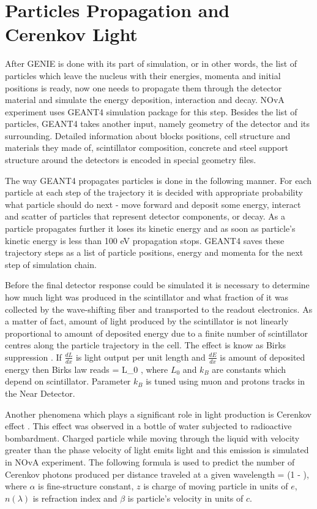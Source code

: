 \section{Particles Propagation and Cerenkov Light}
After GENIE is done with its part of simulation, or in other words, the list of particles which leave 
the nucleus with their energies, momenta and initial positions is ready, now one needs to propagate them
through the detector material and simulate the energy deposition, interaction and decay. NOvA experiment
uses GEANT4 \cite{GEANT4} simulation package for this step. Besides the list of particles, GEANT4 takes
another input, namely geometry of the detector and its surrounding. Detailed information about blocks 
positions, cell structure and materials they made of, scintillator composition, concrete and steel support
structure around the detectors is encoded in special geometry files.

The way GEANT4 propagates particles is done in the following manner. For each particle at each step of the 
trajectory it is decided with appropriate probability what particle should do next - move forward and deposit 
some energy, interact and scatter of particles that represent detector components, or decay. As a particle
propagates further it loses its kinetic energy and as soon as particle's kinetic energy is less than 100 eV
propagation stops. GEANT4 saves these trajectory steps as a list of particle positions, energy and momenta 
for the next step of simulation chain. 

Before the final detector response could be simulated it is necessary to determine how much light was produced
in the scintillator and what fraction of it was collected by the wave-shifting fiber and transported to the 
readout electronics. As a matter of fact, amount of light produced by the scintillator is not linearly 
proportional to amount of deposited energy due to a finite number of scintillator centres along the particle
trajectory in the cell. The effect is know as Birks suppression \cite{birks}. If $\frac{dL}{dx}$ is light 
output per unit length and $\frac{dE}{dx}$ is amount of deposited energy then Birks law reads
\be
{} = L_0 , 
\ee
where $L_0$ and $k_B$ are constants which depend on scintillator. Parameter $k_B$ is tuned using muon and 
protons tracks in the Near Detector.

Another phenomena which plays a significant role in light production is Cerenkov effect \cite{cerenkov}. 
This effect was observed in a bottle of water subjected to radioactive bombardment. Charged particle while
moving through the liquid with velocity greater than the phase velocity of light emits light and this emission 
is simulated in NOvA experiment. The following formula is used to predict the number of Cerenkov photons produced
per distance traveled at a given wavelength 
\be
{} = \Big(1 - \Big),
\ee
where $\alpha$ is fine-structure constant, $z$ is charge of moving particle in units of $e$, $n(\lambda)$ is 
refraction index and $\beta$ is particle's velocity in units of $c$.

